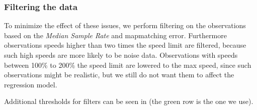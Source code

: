 \subsubsection{Filtering the data}
To minimize the effect of these issues, we perform filtering on the observations based on the \emph{Median Sample Rate} and mapmatching error. Furthermore observations speeds higher than two times the speed limit are filtered, because such high speeds are more likely to be noise data. Observations with speeds between 100\% to 200\% the speed limit are lowered to the max speed, since such observations might be realistic, but we still do not want them to affect the regression model.

Additional thresholds for filters can be seen in  (the green row is the one we use).
